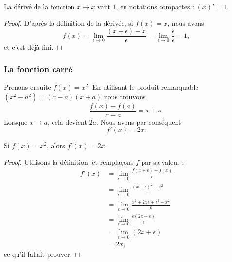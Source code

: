 \begin{proposition}		\label{PROPooMEXAooZJJPYx}
	La dérivé de la fonction \( x\mapsto x\) vaut \( 1\), en notations compactes : \( (x)'=1\).
\end{proposition}

\begin{proof}
	D'après la définition de la dérivée, si \( f(x)=x\), nous avons
	\begin{equation}
		f(x)=\lim_{\epsilon\to 0}\frac{ (x+\epsilon) -x }{\epsilon} =\lim_{\epsilon\to 0}\frac{ \epsilon }{\epsilon} =1,
	\end{equation}
	et c'est déjà fini.
\end{proof}

\subsubsection{La fonction carré}

Prenons ensuite \( f(x)=x^2\). En utilisant le produit remarquable \( (x^2-a^2)=(x-a)(x+a)\) nous trouvons
\begin{equation}
	\frac{ f(x)-f(a) }{ x-a }=x+a.
\end{equation}
Lorsque \( x\to a\), cela devient \( 2a\). Nous avons par conséquent
\begin{equation}
	f'(x)=2x.
\end{equation}

\begin{lemma}           \label{LemDeccCarr}
	Si \( f(x)=x^2\), alors \( f'(x)=2x\).
\end{lemma}

\begin{proof}
	Utilisons la définition, et remplaçons \( f\) par sa valeur :
	\begin{subequations}
		\begin{align}
			f'(x) & =\lim_{\epsilon\to 0}\frac{ f(x+\epsilon)-f(x) }{ \epsilon }            \\
			      & =\lim_{\epsilon\to 0}\frac{ (x+\epsilon)^2-x^2 }{ \epsilon }            \\
			      & =\lim_{\epsilon\to 0}\frac{ x^2+2x\epsilon+\epsilon^2-x^2 }{ \epsilon } \\
			      & =\lim_{\epsilon\to 0}\frac{\epsilon(2x+\epsilon)}{ \epsilon }           \\
			      & =\lim_{\epsilon\to 0}(2x+\epsilon)                                      \\
			      & =2x,
		\end{align}
	\end{subequations}
	ce qu'il fallait prouver.
\end{proof}


